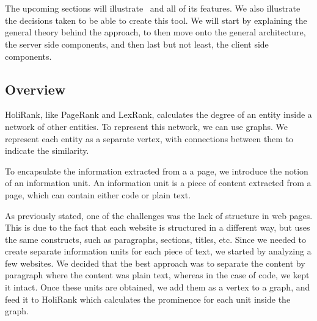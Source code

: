 \section{\projectName}\label{sec:projectDesign}
The upcoming sections will illustrate \projectName~and all of its features. We also illustrate the decisions taken to be able to create this tool. We will start by explaining the general theory behind the approach, to then move onto the general architecture, the server side components, and then last but not least, the client side components. 




\subsection{Overview}
HoliRank\cite{Ponz2017b}, like PageRank\cite{ilprints422} and LexRank\cite{Erkan:2004:LGL:1622487.1622501}, calculates the degree of an entity inside a network of other entities. To represent this network, we can use graphs. We represent each entity as a separate vertex, with connections between them to indicate the similarity. 

To encapsulate the information extracted from a a page, we introduce the notion of an information unit. An information unit is a piece of content extracted from a page, which can contain either code or plain text.

As previously stated, one of the challenges was the lack of structure in web pages. This is due to the fact that each website is structured in a different way, but uses the same constructs, such as paragraphs, sections, titles, etc. Since we needed to create separate information units for each piece of text, we started by analyzing a few websites. We decided that the best approach was to separate the content by paragraph where the content was plain text, whereas in the case of code, we kept it intact. Once these units are obtained, we add them as a vertex to a graph, and feed it to HoliRank\cite{Ponz2017b} which calculates the prominence for each unit inside the graph. 

